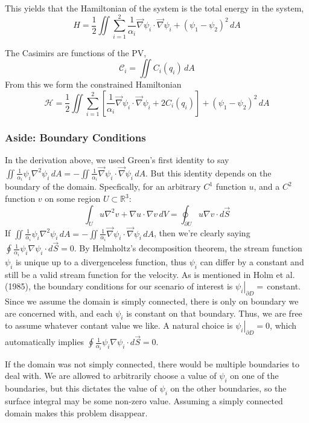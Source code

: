 \documentclass[12pt]{article}
\begin{document}
    This yields that the Hamiltonian of the system is the total energy in the system,
    $$
    H = \frac12 \iint \sum_{i=1}^2 \frac{1}{\alpha_i}\vec\nabla \psi_i \cdot \vec\nabla \psi_i + (\psi_1 - \psi_2)^2 \, dA
    $$

    The Casimirs are functions of the PV,
    $$
    \mathcal{C}_i = \iint C_i(q_i) \, dA
    $$
    From this we form the constrained Hamiltonian
    \begin{equation}
      \mathcal{H} = \frac12 \iint \sum_{i=1}^2 \left[ \frac{1}{\alpha_i} \vec\nabla \psi_i \cdot \vec\nabla \psi_i + 2C_i(q_i) \right]+ (\psi_1 - \psi_2)^2 \, dA
      \label{eqn:qg_tl_h}
    \end{equation}

    \subsubsection{Aside: Boundary Conditions}
      In the derivation above, we used Green's first identity to say $\iint \frac{1}{\alpha_i}\psi_i \nabla^2 \psi_i \, dA = - \iint \frac{1}{\alpha_i} \vec\nabla\psi_i \cdot \vec\nabla\psi_i \, dA$. But this identity depends on the boundary of the domain. Specfically, for an arbitrary $C^1$ function $u$, and a $C^2$ function $v$ on some region $U \subset \mathbb{R}^3$:
      $$
        \int_U u \nabla^2 v + \nabla u \cdot \nabla v \, dV = \oint_{\partial U} u \nabla v \cdot d \vec S
      $$
      If $\iint \frac{1}{\alpha_i}\psi_i \nabla^2 \psi_i \, dA = - \iint \frac{1}{\alpha_i} \vec\nabla\psi_i \cdot \vec\nabla\psi_i \, dA$, then we're clearly saying $\oint \frac{1}{\alpha_i}\psi_i \nabla \psi_i\cdot d \vec S = 0$. By Helmholtz's decomposition theorem, the stream function $\psi_i$ is unique up to a divergenceless function, thus $\psi_i$ can differ by a constant and still be a valid stream function for the velocity. As is mentioned in Holm et al. (1985), the boundary conditions for our scenario of interest is $\left. \psi_i \right|_{\partial D} = \,$constant. Since we assume the domain is simply connected, there is only on boundary we are concerned with, and each $\psi_i$ is constant on that boundary. Thus, we are free to assume whatever contant value we like. A natural choice is $\left. \psi_i \right|_{\partial D} = 0$, which automatically implies $\oint \frac{1}{\alpha_i}\psi_i \nabla \psi_i \cdot d \vec S = 0$.

      If the domain was not simply connected, there would be multiple boundaries to deal with. We are allowed to arbitrarily choose a value of $\psi_i$ on one of the boundaries, but this dictates the value of $\psi_i$ on the other boundaries, so the surface integral may be some non-zero value. Assuming a simply connected domain makes this problem disappear.
\end{document}
